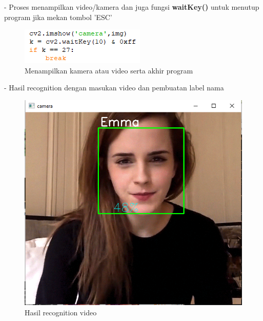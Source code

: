 \begin{enumerate}[1.]
- Proses menampilkan video/kamera dan juga fungsi \textbf{waitKey()} untuk menutup program jika mekan tombol 'ESC'
\begin{figure}[h!]
    \centering
    \includegraphics[width=0.45\linewidth]{images/recognition_9.PNG}
    \caption{Menampilkan kamera atau video serta akhir program}
\end{figure}
\newpage
- Hasil recognition dengan masukan video dan pembuatan label nama
\begin{figure}[h!]
    \centering
    \includegraphics[width=0.65\linewidth]{images/Hasil_recog.PNG}
    \caption{Hasil recognition video}
\end{figure}
\end{enumerate}